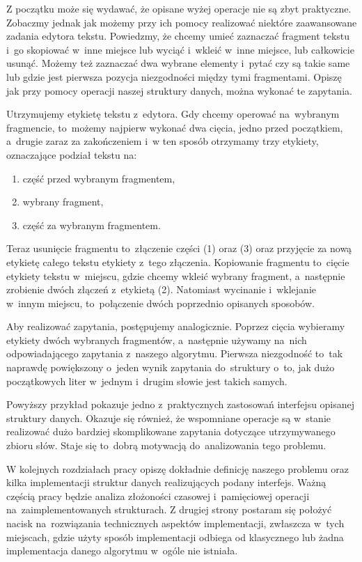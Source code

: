 \documentclass[declaration,shortabstract]{iithesis}
\theoremstyle{definition} \newtheorem{definition}{Definicja}[chapter]
\theoremstyle{remark} \newtheorem{remark}[definition]{Obserwacja}
\theoremstyle{plain} \newtheorem{theorem}[definition]{Twierdzenie}
\theoremstyle{remark} \newtheorem{example}{Przykład}[definition]
\theoremstyle{plain} \newtheorem{lemma}[definition]{Lemat}
\begin{document}
Z początku może się wydawać, że opisane wyżej operacje nie są zbyt praktyczne. Zobaczmy jednak jak możemy przy ich pomocy realizować niektóre zaawansowane zadania edytora tekstu. Powiedzmy, że chcemy umieć zaznaczać fragment tekstu i~go skopiować w~inne miejsce lub wyciąć i~wkleić w~inne miejsce, lub całkowicie usunąć. Możemy też zaznaczać dwa wybrane elementy i~pytać czy są takie same lub gdzie jest pierwsza pozycja niezgodności między tymi fragmentami. Opiszę jak przy pomocy operacji naszej struktury danych, można wykonać te zapytania.

Utrzymujemy etykietę tekstu z~edytora. Gdy chcemy operować na~wybranym fragmencie, to~możemy najpierw wykonać dwa cięcia, jedno przed początkiem, a~drugie zaraz za zakończeniem i~w ten sposób otrzymamy trzy etykiety, oznaczające podział tekstu na:
\begin{enumerate}
    \item część przed wybranym fragmentem,
    \item wybrany fragment,
    \item część za wybranym fragmentem.
\end{enumerate}
Teraz usunięcie fragmentu to~złączenie części (1) oraz (3) oraz przyjęcie za nową etykietę całego tekstu etykiety z~tego złączenia. Kopiowanie fragmentu to~cięcie etykiety tekstu w~miejscu, gdzie chcemy wkleić wybrany fragment, a~następnie zrobienie dwóch złączeń z~etykietą (2). Natomiast wycinanie i~wklejanie w~innym miejscu, to~połączenie dwóch poprzednio opisanych sposobów.

Aby realizować zapytania, postępujemy analogicznie. Poprzez cięcia wybieramy etykiety dwóch wybranych fragmentów, a~następnie używamy na~nich odpowiadającego zapytania z~naszego algorytmu. Pierwsza niezgodność to~tak naprawdę powiększony o~jeden wynik zapytania do~struktury o~to, jak dużo początkowych liter w~jednym i~drugim słowie jest takich samych.

Powyższy przykład pokazuje jedno z~praktycznych zastosowań interfejsu opisanej struktury danych. Okazuje się również, że wspomniane operacje są w~stanie realizować dużo bardziej skomplikowane zapytania dotyczące utrzymywanego zbioru słów. Staje się to~dobrą motywacją do~analizowania tego problemu. 

W kolejnych rozdziałach pracy opiszę dokładnie definicję naszego problemu oraz kilka implementacji struktur danych realizujących podany interfejs. Ważną częścią pracy będzie analiza złożoności czasowej i~pamięciowej operacji na~zaimplementowanych strukturach. Z drugiej strony postaram się położyć nacisk na~rozwiązania technicznych aspektów implementacji, zwłaszcza w~tych miejscach, gdzie użyty sposób implementacji odbiega od klasycznego lub żadna implementacja danego algorytmu w~ogóle nie istniała.
\end{document}
